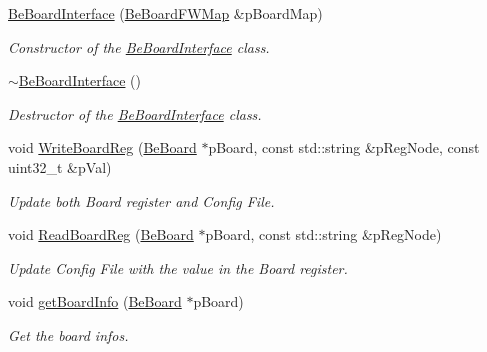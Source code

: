 \begin{DoxyCompactItemize}
\item 
\hyperlink{class_ph2___hw_interface_1_1_be_board_interface_a621bd484157724e03eeba5d52ce0b726}{Be\-Board\-Interface} (\hyperlink{namespace_ph2___hw_interface_ac35d341eb47fa7cbe4d28ccbc6ab4875}{Be\-Board\-F\-W\-Map} \&p\-Board\-Map)
\begin{DoxyCompactList}\small\item\em Constructor of the \hyperlink{class_ph2___hw_interface_1_1_be_board_interface}{Be\-Board\-Interface} class. \end{DoxyCompactList}\item 
\hyperlink{class_ph2___hw_interface_1_1_be_board_interface_ad67b2d931b904565cf6e5881fa0d140e}{$\sim$\-Be\-Board\-Interface} ()
\begin{DoxyCompactList}\small\item\em Destructor of the \hyperlink{class_ph2___hw_interface_1_1_be_board_interface}{Be\-Board\-Interface} class. \end{DoxyCompactList}\item 
void \hyperlink{class_ph2___hw_interface_1_1_be_board_interface_add92a5f30e058c3a384b8fde1015f31a}{Write\-Board\-Reg} (\hyperlink{class_ph2___hw_description_1_1_be_board}{Be\-Board} $\ast$p\-Board, const std\-::string \&p\-Reg\-Node, const uint32\-\_\-t \&p\-Val)
\begin{DoxyCompactList}\small\item\em Update both Board register and Config File. \end{DoxyCompactList}\item 
void \hyperlink{class_ph2___hw_interface_1_1_be_board_interface_a1b3096f0b052d6e9329fdb3b9a8299fb}{Read\-Board\-Reg} (\hyperlink{class_ph2___hw_description_1_1_be_board}{Be\-Board} $\ast$p\-Board, const std\-::string \&p\-Reg\-Node)
\begin{DoxyCompactList}\small\item\em Update Config File with the value in the Board register. \end{DoxyCompactList}\item 
void \hyperlink{class_ph2___hw_interface_1_1_be_board_interface_ae423a6ec7526a0abd9ce3c9e0e3b1847}{get\-Board\-Info} (\hyperlink{class_ph2___hw_description_1_1_be_board}{Be\-Board} $\ast$p\-Board)
\begin{DoxyCompactList}\small\item\em Get the board infos. \end{DoxyCompactList}\item 

\end{DoxyCompactItemize}
